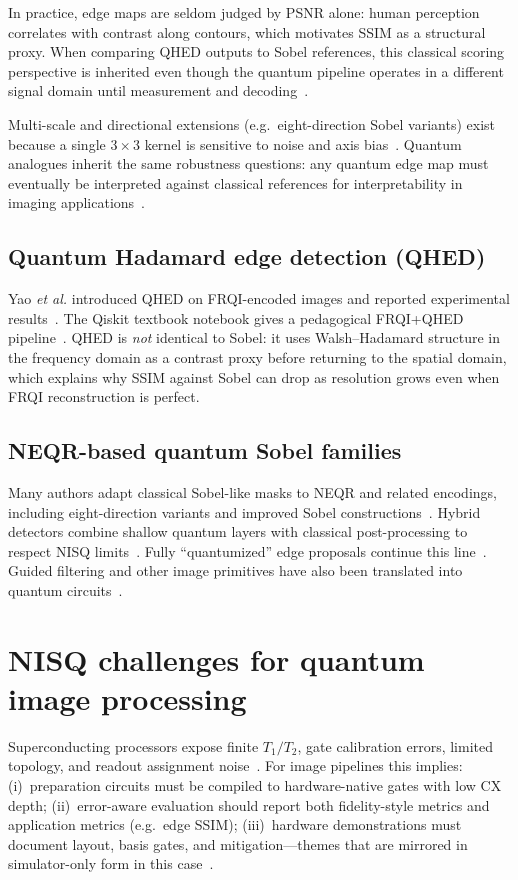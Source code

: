 In practice, edge maps are seldom judged by PSNR alone: human perception correlates with contrast along contours, which motivates SSIM as a structural proxy. When comparing QHED outputs to Sobel references, this classical scoring perspective is inherited even though the quantum pipeline operates in a different signal domain until measurement and decoding~\cite{Chetia2021ImprovedSobelNEQR}.

Multi-scale and directional extensions (e.g.\ eight-direction Sobel variants) exist because a single $3\times 3$ kernel is sensitive to noise and axis bias~\cite{Liu2022EightDirectionSobelNEQR}. Quantum analogues inherit the same robustness questions: any quantum edge map must eventually be interpreted against classical references for interpretability in imaging applications~\cite{Fan2019SobelNEQR}.

\subsection{Quantum Hadamard edge detection (QHED)}
Yao \textit{et al.} introduced QHED on FRQI-encoded images and reported experimental results~\cite{Yao2017QHED}. The Qiskit textbook notebook gives a pedagogical FRQI+QHED pipeline~\cite{QiskitTextbookQuantumEdgeDetection}. QHED is \emph{not} identical to Sobel: it uses Walsh--Hadamard structure in the frequency domain as a contrast proxy before returning to the spatial domain, which explains why SSIM against Sobel can drop as resolution grows even when FRQI reconstruction is perfect.

\subsection{NEQR-based quantum Sobel families}
Many authors adapt classical Sobel-like masks to NEQR and related encodings, including eight-direction variants and improved Sobel constructions~\cite{Fan2019SobelNEQR,Chetia2021ImprovedSobelNEQR,Liu2022EightDirectionSobelNEQR}. Hybrid detectors combine shallow quantum layers with classical post-processing to respect NISQ limits~\cite{Geng2022HybridNISQEdge}. Fully ``quantumized'' edge proposals continue this line~\cite{Shubha2024EdgeDetectionQuantumized}. Guided filtering and other image primitives have also been translated into quantum circuits~\cite{Mu2025GuidedImageFiltering}.

\section{NISQ challenges for quantum image processing}
Superconducting processors expose finite $T_1/T_2$, gate calibration errors, limited topology, and readout assignment noise~\cite{Geng2023ImprovedFRQI}. For image pipelines this implies: (i)~preparation circuits must be compiled to hardware-native gates with low CX depth; (ii)~error-aware evaluation should report both fidelity-style metrics and application metrics (e.g.\ edge SSIM); (iii)~hardware demonstrations must document layout, basis gates, and mitigation---themes that are mirrored in simulator-only form in this case~\cite{Geng2022HybridNISQEdge}.


